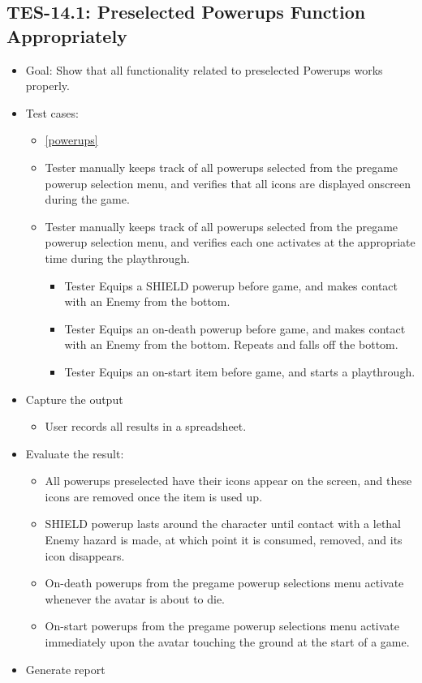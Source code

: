 \subsection{TES-14.1: Preselected Powerups Function Appropriately }
\begin{itemize}
\item Goal: Show that all functionality related to preselected Powerups works properly. 
\item Test cases: 

\begin{itemize}
\item \ref{powerups}
\item Tester manually keeps track of all powerups selected from the pregame powerup selection menu, and verifies that all
icons are displayed onscreen during the game.
\item Tester manually keeps track of all powerups selected from the pregame powerup selection menu, and verifies each one 
activates at the appropriate time during the playthrough.
\begin{itemize}
\item Tester Equips a SHIELD powerup before game, and makes contact with an Enemy from the bottom.
\item Tester Equips an on-death powerup before game, and makes contact with an Enemy from the bottom. Repeats and falls off the bottom.
\item Tester Equips an on-start item before game, and starts a playthrough.
\end{itemize}
\end{itemize}
\item Capture the output 
\begin{itemize}
\item User records all results in a spreadsheet.
\end{itemize}
\item Evaluate the result: 

\begin{itemize}
\item All powerups preselected have their icons appear on the screen, and these icons are removed once the item is used up.
\item SHIELD powerup lasts around the character until contact with a lethal Enemy hazard is made, at which point it is consumed, removed, and its icon disappears.
\item On-death powerups from the pregame powerup selections menu activate whenever the avatar is about to die.
\item On-start powerups from the pregame powerup selections menu activate immediately upon the avatar touching the ground at the start of a game.

\end{itemize}
\item Generate report 
\end{itemize}



